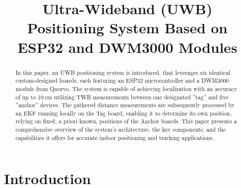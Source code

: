 \documentclass[conference, a4paper]{IEEEtran}
\begin{document}
\renewcommand{\baselinestretch}{0.97} %

\title{Ultra-Wideband (UWB) Positioning System Based on ESP32 and DWM3000 Modules}

\author{  
   \and
   
  }

\maketitle

\begin{abstract}
  In this paper, an \ac{UWB} positioning system is introduced, that leverages six identical custom-designed boards, each featuring an ESP32 microcontroller and a DWM3000 module from Quorvo.
  \newline
  The system is capable of achieving localization with an accuracy of up to 10\,cm utilizing \ac{TWR} measurements between one designated ''tag'' and five ''anchor'' devices.
  The gathered distance measurements are subsequently processed by an \ac{EKF} running locally on the Tag board, enabling it to determine its own position,
  relying on fixed, a priori known, positions of the Anchor boards.
  \newline
  This paper presents a comprehensive overview of the system's architecture, the key components, and the capabilities it offers for accurate indoor positioning and tracking applications.
\end{abstract}


\IEEEpeerreviewmaketitle


\section{Introduction}
\label{sec:Introduction}
\end{document}
